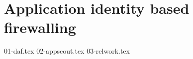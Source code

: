 \chapter{Application identity based firewalling}
\label{appfw:chapter}

{01-daf.tex}
{02-appscout.tex}
{03-relwork.tex}

